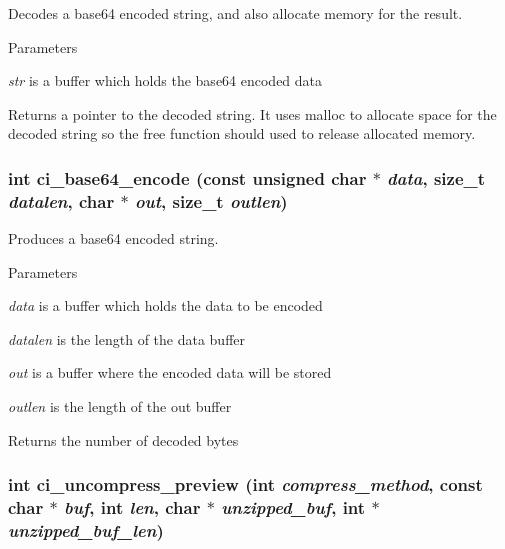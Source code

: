 Decodes a base64 encoded string, and also allocate memory for the result. 
\begin{DoxyParams}{Parameters}
\item[{\em str}]is a buffer which holds the base64 encoded data \end{DoxyParams}
\begin{DoxyReturn}{Returns}
a pointer to the decoded string. It uses malloc to allocate space for the decoded string so the free function should used to release allocated memory. 
\end{DoxyReturn}
\hypertarget{group__UTILITY_ga5230a54d10f5e53b3582f5d94f5bf92e}{
\subsubsection[{ci\_\-base64\_\-encode}]{\setlength{\rightskip}{0pt plus 5cm}int ci\_\-base64\_\-encode (const unsigned char $\ast$ {\em data}, \/  size\_\-t {\em datalen}, \/  char $\ast$ {\em out}, \/  size\_\-t {\em outlen})}}
\label{group__UTILITY_ga5230a54d10f5e53b3582f5d94f5bf92e}


Produces a base64 encoded string. 
\begin{DoxyParams}{Parameters}
\item[{\em data}]is a buffer which holds the data to be encoded \item[{\em datalen}]is the length of the data buffer \item[{\em out}]is a buffer where the encoded data will be stored \item[{\em outlen}]is the length of the out buffer \end{DoxyParams}
\begin{DoxyReturn}{Returns}
the number of decoded bytes 
\end{DoxyReturn}
\hypertarget{group__UTILITY_ga7c6d68ffa3a5633ae759988fedff787c}{
\subsubsection[{ci\_\-uncompress\_\-preview}]{\setlength{\rightskip}{0pt plus 5cm}int ci\_\-uncompress\_\-preview (int {\em compress\_\-method}, \/  const char $\ast$ {\em buf}, \/  int {\em len}, \/  char $\ast$ {\em unzipped\_\-buf}, \/  int $\ast$ {\em unzipped\_\-buf\_\-len})}}
\label{group__UTILITY_ga7c6d68ffa3a5633ae759988fedff787c}


